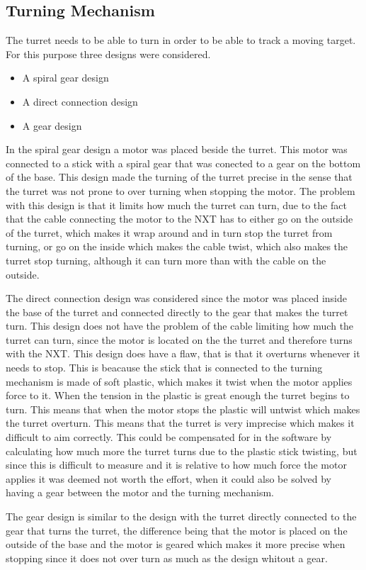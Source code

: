 \subsection{Turning Mechanism}
The turret needs to be able to turn in order to be able to track a moving
target. For this purpose three designs were considered. 

\begin{itemize}
  \item A spiral gear design
  \item A direct connection design
  \item A gear design
\end{itemize}

In the spiral gear design a motor was placed beside the turret. This motor was
connected to a stick with a spiral gear that was conected to a gear on the bottom of the base. This design
made the turning of the turret precise in the sense that the turret was not
prone to over turning when stopping the motor. The problem with this design is
that it limits how much the turret can turn, due to the fact that the cable
connecting the motor to the NXT has to either go on the outside of the turret,
which makes it wrap around and in turn stop the turret from turning, or go on
the inside which makes the cable twist, which also makes the turret stop
turning, although it can turn more than with the cable on the outside.\nl

The direct connection design was considered since the motor was placed inside
the base of the turret and connected directly to the gear that makes the turret turn. This
design does not have the problem of the cable limiting how much the turret can
turn, since the motor is located on the the turret and therefore turns with the
NXT. This design does have a flaw, that is that it overturns whenever it needs
to stop. This is beacause the stick that is connected to the turning mechanism
is made of soft plastic, which makes it twist when the motor applies force to
it. When the tension in the plastic is great enough the turret begins to turn.
This means that when the motor stops the plastic will untwist which makes the
turret overturn. This means that the turret is very imprecise which makes it
difficult to aim correctly. This could be compensated for in the software by
calculating how much more the turret turns due to the plastic stick twisting,
but since this is difficult to measure and it is relative to how much force the motor applies it was deemed
not worth the effort, when it could also be solved by having a gear between
the motor and the turning mechanism.\nl

The gear design is similar to the design with the turret directly connected to
the gear that turns the turret, the difference being that the motor is placed on
the outside of the base and the motor is geared which makes it more precise when
stopping since it does not over turn as much as the design whitout a gear. 


